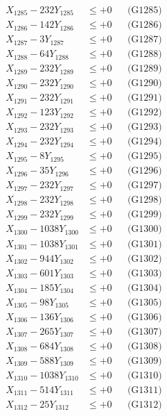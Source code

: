 \documentclass[a4paper,10pt]{article}
\begin{document}
{\begin{align}
X_{1285} - 232Y_{1285} &\leq +0 && \text{(G1285)} \\
X_{1286} - 142Y_{1286} &\leq +0 && \text{(G1286)} \\
X_{1287} - 3Y_{1287} &\leq +0 && \text{(G1287)} \\
X_{1288} - 64Y_{1288} &\leq +0 && \text{(G1288)} \\
X_{1289} - 232Y_{1289} &\leq +0 && \text{(G1289)} \\
X_{1290} - 232Y_{1290} &\leq +0 && \text{(G1290)} \\
\allowbreak
X_{1291} - 232Y_{1291} &\leq +0 && \text{(G1291)} \\
X_{1292} - 123Y_{1292} &\leq +0 && \text{(G1292)} \\
X_{1293} - 232Y_{1293} &\leq +0 && \text{(G1293)} \\
X_{1294} - 232Y_{1294} &\leq +0 && \text{(G1294)} \\
X_{1295} - 8Y_{1295} &\leq +0 && \text{(G1295)} \\
X_{1296} - 35Y_{1296} &\leq +0 && \text{(G1296)} \\
X_{1297} - 232Y_{1297} &\leq +0 && \text{(G1297)} \\
X_{1298} - 232Y_{1298} &\leq +0 && \text{(G1298)} \\
X_{1299} - 232Y_{1299} &\leq +0 && \text{(G1299)} \\
X_{1300} - 1038Y_{1300} &\leq +0 && \text{(G1300)} \\
\allowbreak
X_{1301} - 1038Y_{1301} &\leq +0 && \text{(G1301)} \\
X_{1302} - 944Y_{1302} &\leq +0 && \text{(G1302)} \\
X_{1303} - 601Y_{1303} &\leq +0 && \text{(G1303)} \\
X_{1304} - 185Y_{1304} &\leq +0 && \text{(G1304)} \\
X_{1305} - 98Y_{1305} &\leq +0 && \text{(G1305)} \\
X_{1306} - 136Y_{1306} &\leq +0 && \text{(G1306)} \\
X_{1307} - 265Y_{1307} &\leq +0 && \text{(G1307)} \\
X_{1308} - 684Y_{1308} &\leq +0 && \text{(G1308)} \\
X_{1309} - 588Y_{1309} &\leq +0 && \text{(G1309)} \\
X_{1310} - 1038Y_{1310} &\leq +0 && \text{(G1310)} \\
\allowbreak
X_{1311} - 514Y_{1311} &\leq +0 && \text{(G1311)} \\
X_{1312} - 25Y_{1312} &\leq +0 && \text{(G1312)} \\

\end{align}}
\end{document}
